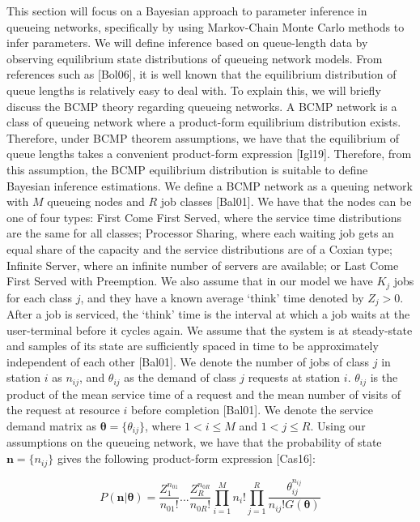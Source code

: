 \documentclass[a4paper,11pt,titlepage]{article}
\begin{document}
This section will focus on a Bayesian approach to parameter inference in queueing networks, specifically by using Markov-Chain Monte Carlo methods to infer parameters. We will define inference based on queue-length data by observing equilibrium state distributions of queueing network models. From references such as [Bol06], it is well known that the equilibrium distribution of queue lengths is relatively easy to deal with. To explain this, we will briefly discuss the BCMP theory regarding queueing networks. A BCMP network is a class of queueing network where a product-form equilibrium distribution exists. Therefore, under BCMP theorem assumptions, we have that the equilibrium of queue lengths takes a convenient product-form expression [Igl19]. Therefore, from this assumption, the BCMP equilibrium distribution is suitable to define Bayesian inference estimations. We define a BCMP network as a queuing network with $M$ queueing nodes and $R$ job classes [Bal01]. We have that the nodes can be one of four types: First Come First Served, where the service time distributions are the same for all classes; Processor Sharing, where each waiting job gets an equal share of the capacity and the service distributions are of a Coxian type; Infinite Server, where an infinite number of servers are available; or Last Come First Served with Preemption. We also assume that in our model we have $K_j$ jobs for each class $j$, and they have a known average `think' time denoted by $Z_j > 0$. After a job is serviced, the `think' time is the interval at which a job waits at the user-terminal before it cycles again. We assume that the system is at steady-state and samples of its
state are sufficiently spaced in time to be approximately independent
of each other [Bal01]. We denote the number of jobs of class $j$ in station $i$ as $n_{ij}$, and $\theta_{ij}$ as the demand of class $j$ requests at station $i$. $\theta_{ij}$ is the product of the mean service time of a request and the mean number of visits of the request at resource $i$ before completion [Bal01]. We denote the service demand matrix as $\bm{\theta} = \{\theta_{ij}\}$, where $1 < i \leq M$ and $1 < j \leq R$. Using our assumptions on the queueing network, we have that the probability of state $\mathbf{n} = \{n_{ij}\}$ gives the following product-form expression [Cas16]: 

\begin{equation}
    P(\mathbf{n}|\bm{\theta}) = \frac{Z_1^{n_{01}}}{n_{01}!}...\frac{Z_R^{n_{0R}}}{n_{0R}!} \prod_{i=1}^{M} n_{i}! \prod_{j=1}^{R} \frac{\theta_{ij}^{n_{ij}}}{n_{ij}!G(\bm{\theta})}
    \label{eqn:state_probs}
\end{equation}
\end{document}
